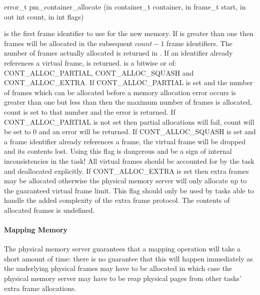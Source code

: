 \begin{code}
error\_t pm\_container\_allocate (in container\_t container, in
frame\_t start, in out int count, in int flags)
\end{code}

\noindent
{} is the first frame identifier to use for the new
memory.  If  is greater than one then frames will be
allocated in the subsequent $count - 1$ frame identifiers.  The number
of frames actually allocated is returned in .  If an
identifier already references a virtual frame,  is
returned.   is a bitwise or of: CONT_ALLOC_PARTIAL,
CONT_ALLOC_SQUASH and CONT_ALLOC_EXTRA.  If CONT_ALLOC_PARTIAL is set
and the number of frames which can be allocated before a memory
allocation error occurs is greater than one but less than
 then the maximum number of frames is allocated, count
is set to that number and the error is returned.  If
CONT_ALLOC_PARTIAL is not set then partial allocations will fail,
count will be set to 0 and an error will be returned.  If
CONT_ALLOC_SQUASH is set and a frame identifier already references a
frame, the virtual frame will be dropped and its contents lost.  Using
this flag is dangerous and be a sign of internal inconsistencies in
the task!  All virtual frames should be accounted for by the task and
deallocated explicitly.  If CONT_ALLOC_EXTRA is set then extra frames
may be allocated otherwise the physical memory server will only
allocate up to the guaranteed virtual frame limit.  This flag should
only be used by tasks able to handle the added complexity of the extra
frame protocol.  The contents of allocated frames is undefined.


\paragraph{Mapping Memory}

The physical memory server guarantees that a mapping operation will
take a short amount of time: there is no guarantee that this will
happen immediately as the underlying physical frames may have to be
allocated in which case the physical memory server may have to be reap
physical pages from other tasks' extra frame allocations.

